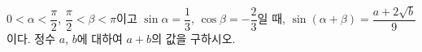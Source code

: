 $0<\alpha<\dfrac{\pi}{2}$, $\dfrac{\pi}{2}<\beta<\pi$이고 $\sin\alpha=\dfrac{1}{3}$, $\cos\beta=-\dfrac{2}{3}$일 때, $\sin(\alpha+\beta)=\dfrac{a+2\sqrt{b}}{9}$이다. 정수 $a$, $b$에 대하여 $a+b$의 값을 구하시오.
